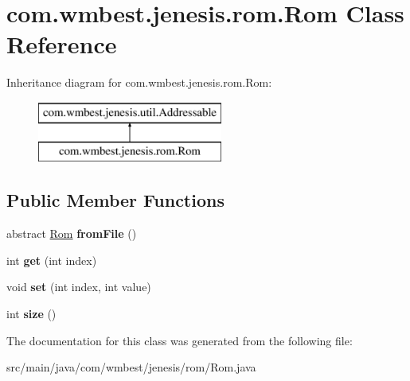 \hypertarget{classcom_1_1wmbest_1_1jenesis_1_1rom_1_1Rom}{\section{com.\-wmbest.\-jenesis.\-rom.\-Rom Class Reference}
\label{classcom_1_1wmbest_1_1jenesis_1_1rom_1_1Rom}
}
Inheritance diagram for com.\-wmbest.\-jenesis.\-rom.\-Rom\-:\begin{figure}[H]
\begin{center}
\leavevmode
\includegraphics[height=2.000000cm]{classcom_1_1wmbest_1_1jenesis_1_1rom_1_1Rom}
\end{center}
\end{figure}
\subsection*{Public Member Functions}
\begin{DoxyCompactItemize}
\item 
\hypertarget{classcom_1_1wmbest_1_1jenesis_1_1rom_1_1Rom_ac4504ad0bc5ece06b52348044da74dcd}{abstract \hyperlink{classcom_1_1wmbest_1_1jenesis_1_1rom_1_1Rom}{Rom} {\bfseries from\-File} ()}\label{classcom_1_1wmbest_1_1jenesis_1_1rom_1_1Rom_ac4504ad0bc5ece06b52348044da74dcd}

\item 
\hypertarget{classcom_1_1wmbest_1_1jenesis_1_1rom_1_1Rom_aa0783ed551e41f5cb9c90f6f6dadab7c}{int {\bfseries get} (int index)}\label{classcom_1_1wmbest_1_1jenesis_1_1rom_1_1Rom_aa0783ed551e41f5cb9c90f6f6dadab7c}

\item 
\hypertarget{classcom_1_1wmbest_1_1jenesis_1_1rom_1_1Rom_ac802040635ca6ba864e308e96b325c97}{void {\bfseries set} (int index, int value)}\label{classcom_1_1wmbest_1_1jenesis_1_1rom_1_1Rom_ac802040635ca6ba864e308e96b325c97}

\item 
\hypertarget{classcom_1_1wmbest_1_1jenesis_1_1rom_1_1Rom_a8c043d9cc1047c0b984aba640c9f2b46}{int {\bfseries size} ()}\label{classcom_1_1wmbest_1_1jenesis_1_1rom_1_1Rom_a8c043d9cc1047c0b984aba640c9f2b46}

\end{DoxyCompactItemize}


The documentation for this class was generated from the following file\-:\begin{DoxyCompactItemize}
\item 
src/main/java/com/wmbest/jenesis/rom/Rom.\-java\end{DoxyCompactItemize}
